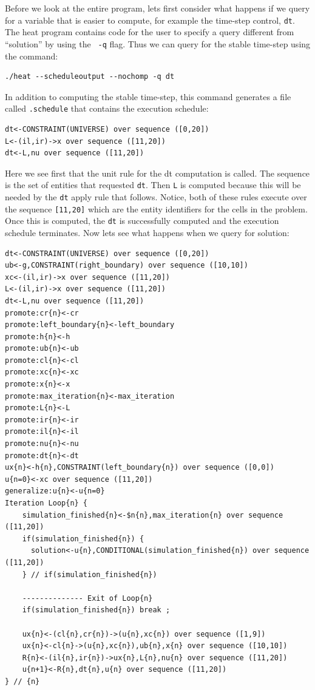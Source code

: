 \documentclass[10pt,epsf,letterpaper,twoside]{book}
\begin{document}
Before we look at the entire program, lets first consider what happens
if we query for a variable that is easier to compute, for example the
time-step control, {\tt dt}.  The heat program contains code for the
user to specify a query different from ``solution'' by using the {\tt
  -q} flag.  Thus we can query for the stable time-step using the
command:
\begin{verbatim}
./heat --scheduleoutput --nochomp -q dt
\end{verbatim}

In addition to computing the stable time-step, this command generates a
file called {\tt .schedule} that contains the execution schedule:
\begin{verbatim}
dt<-CONSTRAINT(UNIVERSE) over sequence ([0,20])
L<-(il,ir)->x over sequence ([11,20])
dt<-L,nu over sequence ([11,20])
\end{verbatim}

Here we see first that the unit rule for the dt computation is
called.  The sequence is the set of entities that requested {\tt dt}.
Then {\tt L} is computed because this will be needed by the {\tt dt}
apply rule that follows.  Notice, both of these rules execute over the
sequence {\tt [11,20]} which are the entity identifiers for the
cells in the problem.  Once this is computed, the {\tt dt} is
successfully computed and the execution schedule terminates.  Now lets
see what happens when we query for solution:

\begin{verbatim}
dt<-CONSTRAINT(UNIVERSE) over sequence ([0,20])
ub<-g,CONSTRAINT(right_boundary) over sequence ([10,10])
xc<-(il,ir)->x over sequence ([11,20])
L<-(il,ir)->x over sequence ([11,20])
dt<-L,nu over sequence ([11,20])
promote:cr{n}<-cr
promote:left_boundary{n}<-left_boundary
promote:h{n}<-h
promote:ub{n}<-ub
promote:cl{n}<-cl
promote:xc{n}<-xc
promote:x{n}<-x
promote:max_iteration{n}<-max_iteration
promote:L{n}<-L
promote:ir{n}<-ir
promote:il{n}<-il
promote:nu{n}<-nu
promote:dt{n}<-dt
ux{n}<-h{n},CONSTRAINT(left_boundary{n}) over sequence ([0,0])
u{n=0}<-xc over sequence ([11,20])
generalize:u{n}<-u{n=0}
Iteration Loop{n} {
    simulation_finished{n}<-$n{n},max_iteration{n} over sequence ([11,20])
    if(simulation_finished{n}) {
      solution<-u{n},CONDITIONAL(simulation_finished{n}) over sequence ([11,20])
    } // if(simulation_finished{n})

    -------------- Exit of Loop{n}
    if(simulation_finished{n}) break ;

    ux{n}<-(cl{n},cr{n})->(u{n},xc{n}) over sequence ([1,9])
    ux{n}<-cl{n}->(u{n},xc{n}),ub{n},x{n} over sequence ([10,10])
    R{n}<-(il{n},ir{n})->ux{n},L{n},nu{n} over sequence ([11,20])
    u{n+1}<-R{n},dt{n},u{n} over sequence ([11,20])
} // {n}
\end{verbatim}
\end{document}
